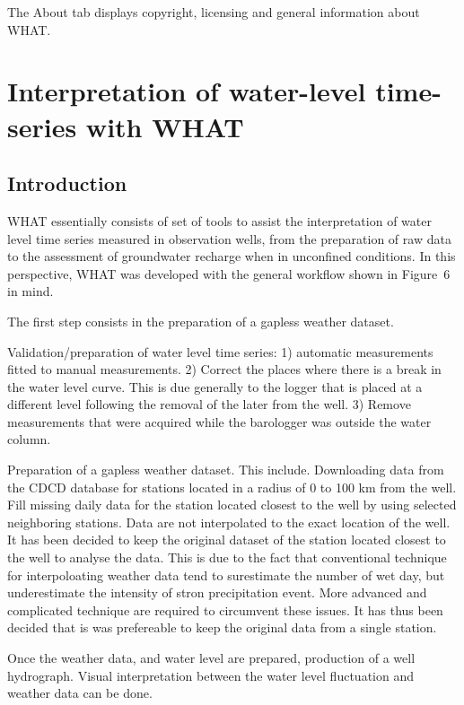 \documentclass[12pt, letterpaper, fleqn]{report}
\begin{document}
The About tab displays copyright, licensing and general information about WHAT.

\section{Interpretation of water-level time-series with WHAT}

\subsection{Introduction}

WHAT essentially consists of set of tools to assist the interpretation of water level time series measured in observation wells, from the preparation of raw data to the assessment of groundwater recharge when in unconfined conditions. In this perspective, WHAT was developed with the general workflow shown in Figure 6  in mind.

The first step consists in the preparation of a gapless weather dataset.

Validation/preparation of water level time series: 1) automatic measurements fitted to manual measurements. 2) Correct the places where there is a break in the water level curve. This is due generally to the logger that is placed at a different level following the removal of the later from the well. 3) Remove measurements that were acquired while the barologger was outside the water column.

Preparation of a gapless weather dataset. This include. Downloading data from the CDCD database for stations located in a radius of 0 to 100 km from the well. Fill missing daily data for the station located closest to the well by using selected neighboring stations. Data are not interpolated to the exact location of the well. It has been decided to keep the original dataset of the station located closest to the well to analyse the data. This is due to the fact that conventional technique for interpoloating weather data tend to surestimate the number of wet day, but underestimate the intensity of stron precipitation event. More advanced and complicated technique are required to circumvent these issues. It has thus been decided that is was prefereable to keep the original data from a single station.

Once the weather data, and water level are prepared, production of a well hydrograph. Visual interpretation between the water level  fluctuation and weather data can be done.
\end{document}
